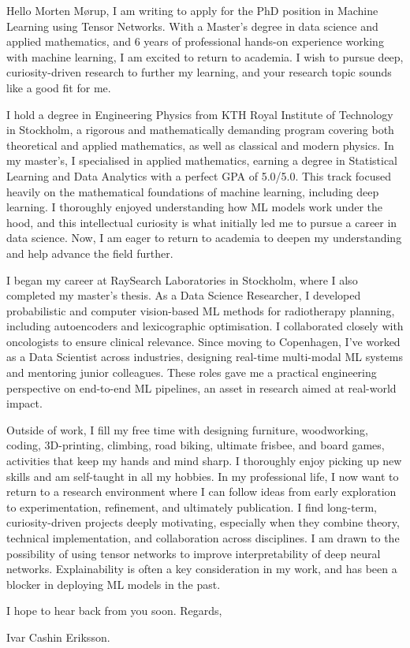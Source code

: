 \documentclass[11pt,a4paper]{moderncv}
\begin{document}
\makecvtitle
Hello Morten Mørup, I am writing to apply for the PhD position in Machine Learning using Tensor Networks. With a Master's degree in data science and applied mathematics, and 6 years of professional hands-on experience working with machine learning, I am excited to return to academia. I wish to pursue deep, curiosity-driven research to further my learning, and your research topic sounds like a good fit for me.

\hspace*{2em}
I hold a degree in Engineering Physics from KTH Royal Institute of Technology in Stockholm, a rigorous and mathematically demanding program covering both theoretical and applied mathematics, as well as classical and modern physics. In my master's, I specialised in applied mathematics, earning a degree in Statistical Learning and Data Analytics with a perfect GPA of 5.0/5.0. This track focused heavily on the mathematical foundations of machine learning, including deep learning. I thoroughly enjoyed understanding how ML models work under the hood, and this intellectual curiosity is what initially led me to pursue a career in data science. Now, I am eager to return to academia to deepen my understanding and help advance the field further.

\hspace*{2em}
I began my career at RaySearch Laboratories in Stockholm, where I also completed my master's thesis. As a Data Science Researcher, I developed probabilistic and computer vision-based ML methods for radiotherapy planning, including autoencoders and lexicographic optimisation. I collaborated closely with oncologists to ensure clinical relevance. Since moving to Copenhagen, I've worked as a Data Scientist across industries, designing real-time multi-modal ML systems and mentoring junior colleagues. These roles gave me a practical engineering perspective on end-to-end ML pipelines, an asset in research aimed at real-world impact.

\hspace*{2em}
Outside of work, I fill my free time with designing furniture, woodworking, coding, 3D-printing, climbing, road biking, ultimate frisbee, and board games, activities that keep my hands and mind sharp. I thoroughly enjoy picking up new skills and am self-taught in all my hobbies. In my professional life, I now want to return to a research environment where I can follow ideas from early exploration to experimentation, refinement, and ultimately publication. I find long-term, curiosity-driven projects deeply motivating, especially when they combine theory, technical implementation, and collaboration across disciplines. I am drawn to the possibility of using tensor networks to improve interpretability of deep neural networks. Explainability is often a key consideration in my work, and has been a blocker in deploying ML models in the past.

\vspace{8 mm}
I hope to hear back from you soon. Regards, 

\vspace{3 mm} 
Ivar Cashin Eriksson.
\end{document}
